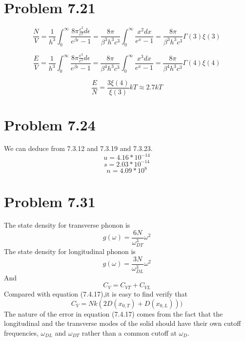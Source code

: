 \documentclass{article}
\begin{document}
\section*{Problem 7.21}
\begin{equation}
\frac{N}{V} = \frac{1}{h^3}\int_0^{\infty} \frac{8\pi \frac{\epsilon^2}{c^3}d\epsilon}{e^{\beta \epsilon}-1} = \frac{8\pi}{\beta^3h^3c^3} \int_0^{\infty} \frac{x^2 dx}{e^{x}-1} =\frac{8\pi}{\beta^3h^3c^3} \Gamma(3) \xi(3)
\end{equation}

\begin{equation}
\frac{E}{V} = \frac{1}{h^3}\int_0^{\infty} \frac{8\pi \frac{\epsilon^3}{c^3}d\epsilon}{e^{\beta \epsilon}-1} = \frac{8\pi}{\beta^4h^3c^3} \int_0^{\infty} \frac{x^3 dx}{e^{x}-1} =\frac{8\pi}{\beta^4h^3c^3} \Gamma(4) \xi(4)
\end{equation}

\begin{equation}
\frac{E}{N} = \frac{3\xi(4)}{\xi(3)} kT \approx 2.7kT
\end{equation}

\section*{Problem 7.24}
We can deduce from 7.3.12 and 7.3.19 and 7.3.23.
$$u=4.16*10^{-14}$$
$$s=2.03*10^{-14}$$
$$n=4.09*10^{8}$$


\section*{Problem 7.31}
The state density for transverse phonon is
\begin{equation}
g(\omega) = \frac{6N}{\omega^3_{DT}} \omega^2
\end{equation}
The state density for longitudinal phonon is
\begin{equation}
g(\omega) = \frac{3N}{\omega^3_{DL}} \omega^2
\end{equation}
And
\begin{equation}
C_V = C_{VT} + C_{VL}
\end{equation}
Compared with equation (7.4.17),it is easy to find verify that
\begin{equation}
C_V = Nk(2D(x_{0,T}) + D(x_{0,L})))
\end{equation}
The nature of the error in equation (7.4.17) comes from the fact that the longitudinal and the transverse modes of the solid should have their own cutoff frequencies, $\omega_{DL}$ and $\omega_{DT}$ rather than a common cutoff at $\omega_{D}$.
\end{document}

